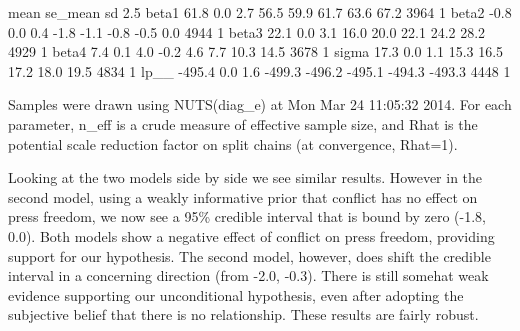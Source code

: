 \documentclass[12pt]{article}
\begin{document}
\begin{enumerate}
\begin{Schunk}
\begin{Soutput}
        mean se_mean  sd   2.5%
beta1   61.8     0.0 2.7   56.5   59.9   61.7   63.6   67.2  3964    1
beta2   -0.8     0.0 0.4   -1.8   -1.1   -0.8   -0.5    0.0  4944    1
beta3   22.1     0.0 3.1   16.0   20.0   22.1   24.2   28.2  4929    1
beta4    7.4     0.1 4.0   -0.2    4.6    7.7   10.3   14.5  3678    1
sigma   17.3     0.0 1.1   15.3   16.5   17.2   18.0   19.5  4834    1
lp__  -495.4     0.0 1.6 -499.3 -496.2 -495.1 -494.3 -493.3  4448    1

Samples were drawn using NUTS(diag_e) at Mon Mar 24 11:05:32 2014.
For each parameter, n_eff is a crude measure of effective sample size,
and Rhat is the potential scale reduction factor on split chains (at 
convergence, Rhat=1).
\end{Soutput}
\end{Schunk}

Looking at the two models side by side we see similar results.  However in the second model, using a weakly informative prior that conflict has no effect on press freedom, we now see a 95\% credible interval that is bound by zero (-1.8, 0.0).  Both models show a negative effect of conflict on press freedom, providing support for our hypothesis.  The second model, however, does shift the credible interval in a concerning direction (from -2.0, -0.3).  There is still somehat weak evidence supporting our unconditional hypothesis, even after adopting the subjective belief that there is no relationship.  These results are fairly robust.

\end{enumerate}
\end{document}
